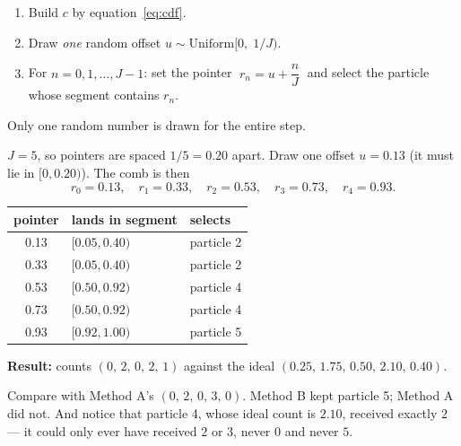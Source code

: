 \documentclass[11pt,a4paper]{report}
\begin{document}
\begin{plain}
\begin{enumerate}[leftmargin=1.8em,itemsep=1pt]
\item Build $c$ by equation~\eqref{eq:cdf}.
\item Draw \emph{one} random offset $u \sim \mathrm{Uniform}\bigl[0,\; 1/J\bigr)$.
\item For $n = 0, 1, \ldots, J-1$: set the pointer
      $\;r_n = u + \dfrac{n}{J}\;$ and select the particle whose segment
      contains $r_n$.
\end{enumerate}
Only one random number is drawn for the entire step.
\end{plain}

\begin{handbox}
$J = 5$, so pointers are spaced $1/5 = 0.20$ apart. Draw one offset
$u = 0.13$ (it must lie in $[0, 0.20)$). The comb is then
\[
r_0 = 0.13,\quad r_1 = 0.33,\quad r_2 = 0.53,\quad r_3 = 0.73,\quad r_4 = 0.93 .
\]

\begin{center}
\begin{tabular}{@{}cll@{}}
\toprule
pointer & lands in segment & selects \\
\midrule
0.13 & $[0.05, 0.40)$ & particle 2 \\
0.33 & $[0.05, 0.40)$ & particle 2 \\
0.53 & $[0.50, 0.92)$ & particle 4 \\
0.73 & $[0.50, 0.92)$ & particle 4 \\
0.93 & $[0.92, 1.00)$ & particle 5 \\
\bottomrule
\end{tabular}
\end{center}

\textbf{Result:} counts $(0,\,2,\,0,\,2,\,1)$ against the ideal
$(0.25,\,1.75,\,0.50,\,2.10,\,0.40)$.

Compare with Method A's $(0,\,2,\,0,\,3,\,0)$. Method B kept particle 5;
Method A did not. And notice that particle 4, whose ideal count is $2.10$,
received exactly $2$ --- it could only ever have received $2$ or $3$, never
$0$ and never $5$.
\end{handbox}
\end{document}
